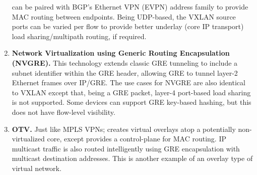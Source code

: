 \begin{enumerate}
  can be paired with BGP’s Ethernet VPN (EVPN) address family to provide MAC
  routing between endpoints. Being UDP-based, the VXLAN source ports can be
  varied per flow to provide better underlay (core IP transport) load
  sharing/multipath routing, if required.
  \item \textbf{Network Virtualization using Generic Routing Encapsulation
  (NVGRE).} This technology extends classic GRE tunneling to include a subnet
  identifier within the GRE header, allowing GRE to tunnel layer-2 Ethernet
  frames over IP/GRE. The use cases for NVGRE are also identical to VXLAN
  except that, being a GRE packet, layer-4 port-based load sharing is not
  supported. Some devices can support GRE key-based hashing, but this does not
  have flow-level visibility.
  \item \textbf{OTV.} Just like MPLS VPNs; creates virtual overlays atop a
  potentially non-virtualized core, except provides a control-plane for MAC
  routing. IP multicast traffic is also routed intelligently using GRE
  encapsulation with multicast destination addresses. This is another example
  of an overlay type of virtual network.
\end{enumerate}

